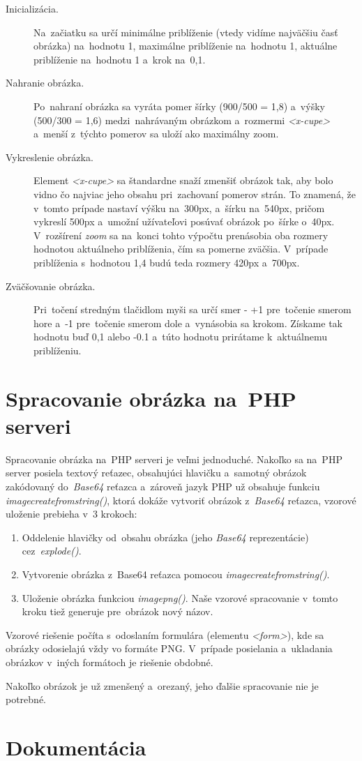 \begin{description}
	\item[Inicializácia.] Na~začiatku sa určí minimálne priblíženie (vtedy vidíme najväčšiu časť obrázka) na~hodnotu 1, maximálne priblíženie na~hodnotu 1, aktuálne priblíženie na~hodnotu 1 a~krok na~0,1.

	\item[Nahranie obrázka.] Po~nahraní obrázka sa vyráta pomer šírky (900/500 = 1,8) a~výšky (500/300 = 1,6) medzi~nahrávaným obrázkom a~rozmermi \emph{<x-cupe>} a~menší z~týchto pomerov sa uloží ako maximálny zoom.

	\item[Vykreslenie obrázka.] Element \emph{<x-cupe>} sa štandardne snaží zmenšiť obrázok tak, aby bolo vidno čo najviac jeho obsahu pri~zachovaní pomerov strán. To znamená, že v~tomto prípade nastaví výšku na~300px, a~šírku na~540px, pričom vykreslí 500px a~umožní užívateľovi posúvať obrázok po~šírke o~40px. V~rozšírení \emph{zoom} sa na~konci tohto výpočtu prenásobia oba rozmery hodnotou aktuálneho priblíženia, čím sa pomerne zväčšia. V~prípade priblíženia s~hodnotou 1,4 budú teda rozmery 420px a~700px.

	\item[Zväčšovanie obrázka.] Pri~točení stredným tlačidlom myši sa určí smer - +1 pre~točenie smerom hore a~-1 pre~točenie smerom dole a~vynásobia sa krokom. Získame tak hodnotu buď 0,1 alebo -0.1 a~túto hodnotu prirátame k~aktuálnemu priblíženiu.
\end{description}


\section{Spracovanie obrázka na~PHP serveri}

Spracovanie obrázka na~PHP serveri je veľmi jednoduché. Nakoľko sa na~PHP server posiela textový reťazec, obsahujúci hlavičku a~samotný obrázok zakódovaný do~\emph{Base64} reťazca a~zároveň jazyk PHP už obsahuje funkciu \emph{imagecreatefromstring()}, ktorá dokáže vytvoriť obrázok z~\emph{Base64} reťazca, vzorové uloženie prebieha v~3 krokoch:

\begin{enumerate}
	\item Oddelenie hlavičky od~obsahu obrázka (jeho \emph{Base64} reprezentácie) cez~\emph{explode()}.
	\item Vytvorenie obrázka z~Base64 reťazca pomocou \emph{imagecreatefromstring()}.
	\item Uloženie obrázka funkciou \emph{imagepng()}. Naše vzorové spracovanie v~tomto kroku tiež generuje pre~obrázok nový názov.
\end{enumerate}

Vzorové riešenie počíta s~odoslaním formulára (elementu \emph{<form>}), kde sa obrázky odosielajú vždy vo formáte PNG. V~prípade posielania a~ukladania obrázkov v~iných formátoch je riešenie obdobné.

Nakoľko obrázok je už zmenšený a~orezaný, jeho ďalšie spracovanie nie je potrebné.

\section{Dokumentácia}